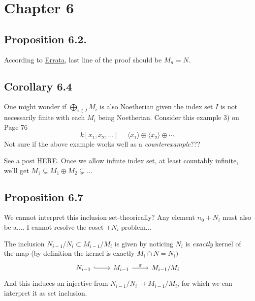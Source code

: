 \section{Chapter 6}

\subsection{Proposition 6.2.}

According to \href{https://mathoverflow.net/questions/42241/errata-for-atiyah-macdonald}{Errata}, last line of the proof should be $M_n=N$.

\subsection{Corollary 6.4}

One might wonder if $\bigoplus_{i\in I}M_i$ is also Noetherian given the index set $I$ is not necessarily finite with each $M_i$ being Noetherian. 
Consider this example 3) on Page 76
$$k[x_1,x_2,...]=\langle x_1\rangle \oplus\langle x_2\rangle\oplus\cdots.$$
Not sure if the above example works well as a \textit{counterexample}???

See a post \href{https://math.stackexchange.com/questions/173614/question-about-direct-sum-of-noetherian-modules-is-noetherian}{HERE}. 
Once we allow infinte index set, at least countably infinite, we'll get $M_1\subsetneq M_1\oplus M_2\subsetneq...$

\subsection{Proposition 6.7}

We cannot interpret this inclusion set-theorically? Any element $n_{0}+N_i$ must also be a.... I cannot resolve the coset $+N_i$ problem... 

The inclusion $N_{i-1}/N_i\subset M_{i-1}/M_i$ is given by noticing $N_i$ is \textit{exactly} kernel of the map (by definition the kernel is exactly $M_i\cap N=N_{i})$
\[\begin{tikzcd}
	{N_{i-1}} & {M_{i-1}} & {M_{i-1}/M_i}
	\arrow[hook, from=1-1, to=1-2]
	\arrow["\pi", from=1-2, to=1-3]
\end{tikzcd}\]
And this induces an injective from $N_{i-1}/N_i\to M_{i-1}/M_i$, for which we can interpret it as set inclusion.

